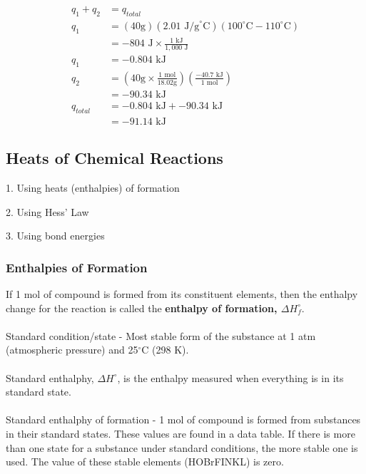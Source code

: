 \documentclass[11pt]{article}
\begin{document}
    \begin{equation*}
        \begin{aligned}
            q_{1} + q_{2} &= q_{total} \\
            q_{1} &= (40\text{g})(2.01\text{ J/g}^\circ\text{C})(100^\circ\text{C} - 110^\circ\text{C}) \\
            &=-804 \text{ J} \times \frac{1\text{ kJ}}{1,000 \text{ J}} \\
            q_{1} &= -0.804\text{ kJ}\\
            q_{2} &= \left(40\text{g} \times \frac{1\text{ mol}}{18.02\text{g}}\right)\left(\frac{-40.7\text{ kJ}}{1 \text{ mol}}\right) \\
            &= -90.34 \text{ kJ} \\
            q_{total} &= -0.804\text{ kJ} + -90.34 \text{ kJ} \\
            &= -91.14 \text{ kJ}
        \end{aligned}
    \end{equation*}

    \subsection{Heats of Chemical Reactions}
    \begin{description}
        \item 1. Using heats (enthalpies) of formation
        \item 2. Using Hess' Law
        \item 3. Using bond energies
    \end{description}
    \newpage

    \subsubsection{Enthalpies of Formation}
    If 1 mol of compound is formed from its constituent elements, then the enthalpy change for the reaction is called the \textbf{enthalpy of formation, $\Delta H^\circ_{f}$}. \\
    \\
    Standard condition/state -  Most stable form of the substance at 1 atm (atmospheric pressure) and 25$^\circ$C (298 K). \\
    \\
    Standard enthalphy, $\Delta H^\circ$, is the enthalpy measured when everything is in its standard state. \\
    \\
    Standard enthalphy of formation - 1 mol of compound is formed from substances in their standard states. These values are found in a data table. If there is more than one state for a substance under standard conditions, the more stable one is used. The value of these stable elements (HOBrFINKL) is zero.
\end{document}
